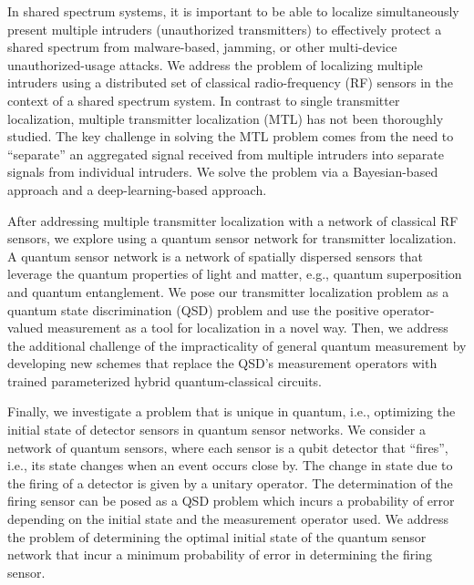 
In shared spectrum systems, it is important to be able to localize simultaneously present multiple intruders 
(unauthorized transmitters) to effectively protect a shared spectrum from malware-based, jamming, 
or other multi-device unauthorized-usage attacks. We address the problem of localizing multiple intruders using 
a distributed set of classical radio-frequency (RF) sensors in the context of a shared spectrum system. 
In contrast to single transmitter localization, multiple transmitter localization (MTL) has not been thoroughly studied. 
The key challenge in solving the MTL problem comes from the need to “separate” an aggregated signal received from 
multiple intruders into separate signals from individual intruders. We solve the problem via a Bayesian-based approach 
and a deep-learning-based approach. 

After addressing multiple transmitter localization with a network of classical RF sensors, 
we explore using a quantum sensor network for transmitter localization. 
A quantum sensor network is a network of spatially dispersed sensors that leverage the quantum properties of light and matter, 
e.g., quantum superposition and quantum entanglement. We pose our transmitter localization problem as 
a quantum state discrimination (QSD) problem and use the positive operator-valued measurement as a tool 
for localization in a novel way. Then, we address the additional challenge of the impracticality 
of general quantum measurement by developing new schemes that replace the QSD’s measurement operators 
with trained parameterized hybrid quantum-classical circuits. 

Finally, we investigate a problem that is unique in quantum, i.e., optimizing the initial state of detector sensors 
in quantum sensor networks. We consider a network of quantum sensors, where each sensor is a qubit detector that “fires”, 
i.e., its state changes when an event occurs close by. The change in state due to the firing of a detector is given 
by a unitary operator. The determination of the firing sensor can be posed as a QSD problem which incurs a probability 
of error depending on the initial state and the measurement operator used. We address the problem of determining 
the optimal initial state of the quantum sensor network that incur a minimum probability of error in determining the firing sensor.


